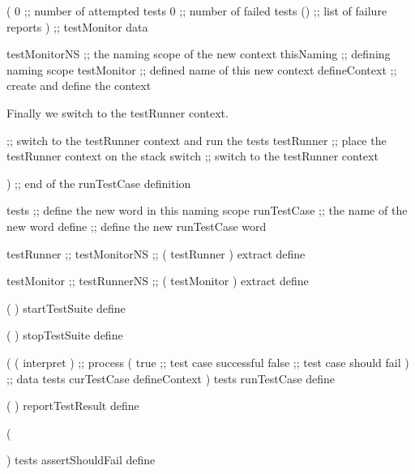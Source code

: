   ( 
    0           ;; number of attempted tests
    0           ;; number of failed tests
    ()          ;; list of failure reports
  )             ;; testMonitor data

  testMonitorNS ;; the naming scope of the new context
  thisNaming    ;; defining naming scope
  testMonitor   ;; defined name of this new context
  defineContext ;; create and define the context
\stopJoylolCode

Finally we switch to the testRunner context.

\startJoylolCode
  ;; switch to the testRunner context and run the tests
  testRunner ;; place the testRunner context on the stack
  switch     ;; switch to the testRunner context
  
)            ;; end of the runTestCase definition

tests        ;; define the new word in this naming scope
runTestCase  ;; the name of the new word
define       ;; define the new runTestCase word
\stopJoylolCode

\startJoylolCode
testRunner ;;
testMonitorNS ;;
(
  testRunner
) extract
define

testMonitor ;;
testRunnerNS ;;
(
  testMonitor
) extract
define


\stopJoylolCode


\stopTestSuite

\starttyping
{}

\startJoylolCode
  (
  )
  startTestSuite
  define
  
  (
  )
  stopTestSuite
  define
\stopJoylolCode

\stopTestSuite
\stoptyping


\startJoylolCode
(
  ( interpret ) ;; process
  (
    true ;; test case successful
    false ;; test case should fail
  ) ;; data
  tests
  curTestCase
  defineContext
)
tests
runTestCase
define
\stopJoylolCode

\stopTestSuite

\startTestSuite[reportTestResult]

\startJoylolCode
  (
  )
  reportTestResult
  define
\stopJoylolCode

\stopTestSuite

\startTestSuite[assertShouldFail]

\startJoylolCode

(
  
)
tests
assertShouldFail
define
\stopJoylolCode

